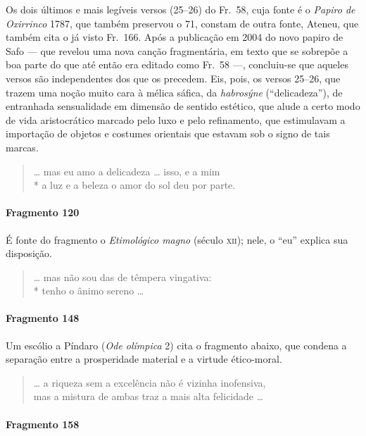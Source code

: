 {{\small Os dois últimos e mais legíveis versos (25--26) do Fr.~58, cuja fonte é o
\textit{Papiro de Oxirrinco }1787, que também preservou o 71, constam de outra
fonte, Ateneu, que também cita o já visto Fr.~166. Após a publicação em 2004 do
novo papiro de Safo --- que revelou uma nova canção fragmentária, em texto que se
sobrepõe a boa parte do que até então era editado como Fr.~58 ---, concluiu-se que aqueles
versos são independentes dos que os precedem. Eis, pois, os versos 25--26, que
trazem uma noção muito cara à mélica sáfica, da \textit{habrosýne}
(``delicadeza”), de entranhada sensualidade em dimensão de sentido
estético, que alude a certo modo de vida aristocrático marcado pelo luxo e pelo
refinamento, que estimulavam a importação de objetos e costumes orientais que
estavam sob o signo de tais marcas.}

\begin{verse}
\ldots{} mas eu amo a delicadeza \ldots{} isso, e a mim \\*
a luz e a beleza o amor do sol deu por parte.
\end{verse}

\paragraph{Fragmento 120}

{\small É fonte do fragmento o \textit{Etimológico magno} (século \textsc{xii}); nele, o “eu”
explica sua disposição.}

\begin{verse}
\ldots{} mas não sou das de têmpera vingativa:\\*
tenho o ânimo sereno \ldots{}
\end{verse}

\paragraph{Fragmento 148}

{\small Um escólio a Píndaro (\textit{Ode olímpica} 2) cita o fragmento abaixo,
que condena a separação entre a prosperidade material e a virtude ético-moral.}

\begin{verse}
\ldots{} a riqueza sem a excelência não é vizinha \qb{}inofensiva,\\
mas a mistura de ambas traz a mais alta felicidade \ldots{}
\end{verse}

\paragraph{Fragmento 158}

}
